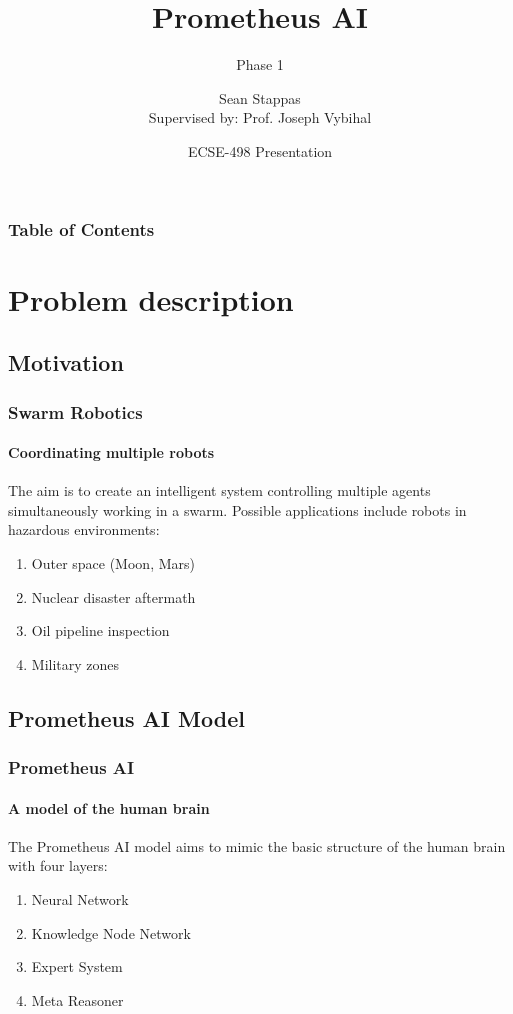\documentclass{beamer}
\title[Prometheus AI] %
{Prometheus AI}
\subtitle{Phase 1}
\author[Sean Stappas] %
{Sean Stappas
	\\{\small Supervised by: Prof. Joseph Vybihal}}
\date[March 30, 2017] %
{ECSE-498 Presentation}
\begin{document}
	\lstset{language=Java} 
	\beamertemplatenavigationsymbolsempty
	\frame{\titlepage}
	
	\begin{frame}
		\frametitle{Table of Contents}
		\tableofcontents
	\end{frame}
	
	\section{Problem description}
	
	\subsection{Motivation}
	
	\begin{frame}
		\frametitle{Swarm Robotics}
		\framesubtitle{Coordinating multiple robots}
		The aim is to create an intelligent system controlling multiple agents simultaneously working in a swarm. Possible applications include robots in hazardous environments:
		\begin{enumerate}
			\item Outer space (Moon, Mars)
			\item Nuclear disaster aftermath
			\item Oil pipeline inspection
			\item Military zones
		\end{enumerate}
	\end{frame}
	
	\subsection{Prometheus AI Model}
	
	\begin{frame}
		\frametitle{Prometheus AI}
		\framesubtitle{A model of the human brain}
		The Prometheus AI model aims to mimic the basic structure of the human brain with four layers:
		\begin{enumerate}
			\item Neural Network
			\item Knowledge Node Network
			\item Expert System
			\item Meta Reasoner
		\end{enumerate}
	\end{frame}
\end{document}
